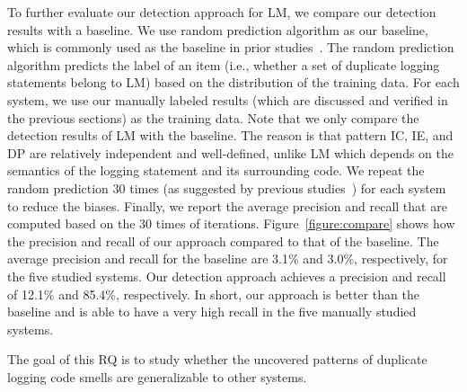 To further evaluate our detection approach for LM, we compare our detection results with a baseline. We use random prediction algorithm as our baseline, which is commonly used as the baseline in prior studies~\cite{DBLP:conf/esem/XiaSKLW16, ELBlocker, BlockBugs}. The random prediction algorithm predicts the label of an item (i.e., whether a set of duplicate logging statements belong to LM) based on the distribution of the training data. %
For each system, we use our manually labeled results (which are discussed and verified in the previous sections) as the training data. Note that we only compare the detection results of LM with the baseline. The reason is that pattern IC, IE, and DP are relatively independent and well-defined, unlike LM which depends on the semantics of the logging statement and its surrounding code. We repeat the random prediction 30 times (as suggested by previous studies~\cite{30times, peter_icse}) for each system to reduce the biases. Finally, we report the average precision and recall that are computed based on the 30 times of iterations. Figure~\ref{figure:compare} shows how the precision and recall of our approach compared to that of the baseline. The average precision and recall for the baseline are 3.1\% and 3.0\%, respectively, for the five studied systems. Our detection approach achieves a precision and recall of 12.1\% and 85.4\%, respectively. In short, our approach is better than the baseline and is able to have a very high recall in the five manually studied systems.




The goal of this RQ is to study whether the uncovered patterns of duplicate logging code smells are generalizable to other systems.

